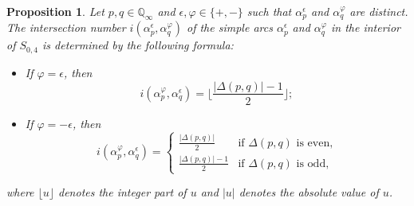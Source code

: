 \documentclass[11pt,a4paper,reqno]{amsart}%
\theoremstyle{plain}
\newtheorem{proposition}[proposition]{Proposition}
\theoremstyle{definition}
\numberwithin{equation}{section}
\numberwithin{equation}{section}
\newcommand{\QQi}{\mathbb{Q}_\infty}
\begin{document}
  

\begin{proposition}\label{inner int}
Let $p, q\in\QQi$  and $\epsilon,\varphi\in\{+,-\}$ such that $\alpha_p^\epsilon$ and $\alpha_q^\varphi$ are distinct. The  intersection number  $i(\alpha_{p}^{\epsilon},\alpha_{q}^{\varphi})$  of the   simple arcs $\alpha_{p}^{\epsilon}$ and $\alpha_{q}^{\varphi}$ in the interior of $S_{0,4}$ is determined by the following formula:
\begin{itemize}
\item If  $\varphi=\epsilon$, then
$$i(\alpha_{p}^{\varphi}, \alpha_{q}^{\epsilon})= \lfloor \frac{|\Delta(p,q)|-1}{2} \rfloor;$$
\item If  $\varphi=-\epsilon$, then
$$i(\alpha_{p}^{\varphi}, \alpha_{q}^{\epsilon})=\begin{cases}
   \frac{|\Delta(p,q)| }{2}  & \text{if $\Delta(p,q)$ is even,} \\
  \frac{|\Delta(p,q)|-1 }{2} &\text{if $\Delta(p,q)$ is odd,}
\end{cases} $$
\end{itemize}
where $\lfloor u \rfloor$ denotes the integer part of $u$ and $|u|$ denotes the absolute  value of $u$.
\end{proposition}
\end{document}
